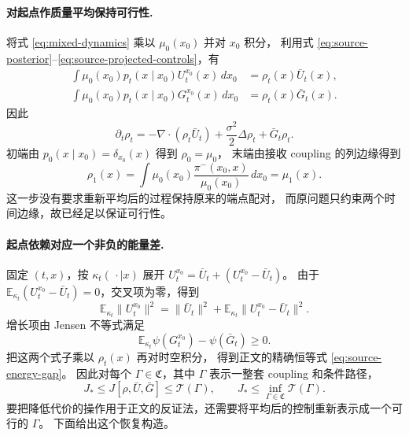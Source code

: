 \documentclass[UTF8,a4paper,11pt,fontset=fandol]{ctexart}
\begin{document}
\paragraph{对起点作质量平均保持可行性.}
将式 \eqref{eq:mixed-dynamics} 乘以 $\mu_0(x_0)$ 并对 $x_0$ 积分，
利用式 \eqref{eq:source-posterior}--\eqref{eq:source-projected-controls}，有
\begin{equation}
\begin{aligned}
\int\mu_0(x_0)p_t(x\mid x_0)U_t^{x_0}(x)\,dx_0
&=\rho_t(x)\bar U_t(x),\\
\int\mu_0(x_0)p_t(x\mid x_0)G_t^{x_0}(x)\,dx_0
&=\rho_t(x)\bar G_t(x).
\end{aligned}
\end{equation}
因此
\begin{equation}
\partial_t\rho_t
=-\nabla\cdot(\rho_t\bar U_t)
+\frac{\sigma^2}{2}\Delta\rho_t+\bar G_t\rho_t.
\end{equation}
初端由 $p_0(x\mid x_0)=\delta_{x_0}(x)$ 得到 $\rho_0=\mu_0$，
末端由接收 coupling 的列边缘得到
\begin{equation}
\rho_1(x)
=\int\mu_0(x_0)\frac{\pi^-(x_0,x)}{\mu_0(x_0)}\,dx_0
=\mu_1(x).
\end{equation}
这一步没有要求重新平均后的过程保持原来的端点配对，
而原问题只约束两个时间边缘，故已经足以保证可行性。

\paragraph{起点依赖对应一个非负的能量差.}
固定 $(t,x)$，按 $\kappa_t(\,\cdot\mid x)$ 展开
$U_t^{x_0}=\bar U_t+(U_t^{x_0}-\bar U_t)$。
由于
$\mathbb E_{\kappa_t}(U_t^{x_0}-\bar U_t)=0$，交叉项为零，得到
\begin{equation}
\mathbb E_{\kappa_t}\|U_t^{x_0}\|^2
=\|\bar U_t\|^2+
\mathbb E_{\kappa_t}\|U_t^{x_0}-\bar U_t\|^2.
\end{equation}
增长项由 Jensen 不等式满足
\begin{equation}
\mathbb E_{\kappa_t}\psi(G_t^{x_0})-\psi(\bar G_t)\ge0.
\end{equation}
把这两个式子乘以 $\rho_t(x)$ 再对时空积分，
得到正文的精确恒等式 \eqref{eq:source-energy-gap}。
因此对每个 $\Gamma\in\mathfrak C$，其中 $\Gamma$ 表示一整套 coupling 和条件路径，
\begin{equation}
J_*\le J[\rho,\bar U,\bar G]\le\mathcal T(\Gamma),
\qquad
J_*\le\inf_{\Gamma\in\mathfrak C}\mathcal T(\Gamma).
\label{eq:first-infimum-bound}
\end{equation}
要把降低代价的操作用于正文的反证法，还需要将平均后的控制重新表示成一个可行的 $\Gamma$。
下面给出这个恢复构造。
\end{document}
